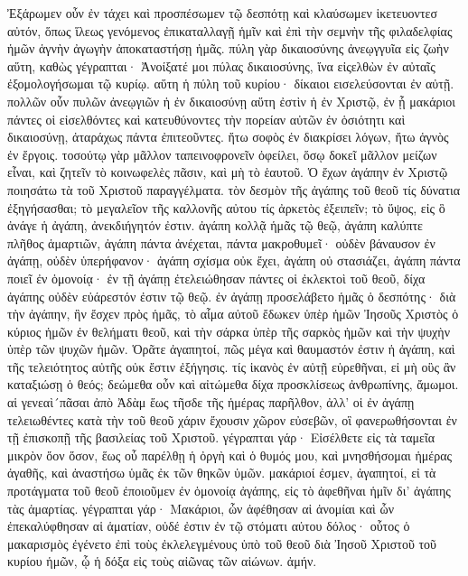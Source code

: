 Ἐξάρωμεν οὖν ἐν τάχει καὶ προσπέσωμεν τῷ δεσπότῃ καὶ κλαύσωμεν ἱκετευοντεσ αὐτόν, ὅπως ἵλεως γενόμενος ἐπικαταλλαγῇ ἡμῖν καὶ ἐπὶ τὴν σεμνὴν τῆς φιλαδελφίας ἡμῶν ἁγνὴν ἀγωγὴν ἀποκαταστήσῃ ἡμᾶς. πύλη γὰρ δικαιοσύνης ἀνεῳγγυῖα εἰς ζωὴν αὕτη, καθὼς γέγραπται· Ἀνοίξατέ μοι πύλας δικαιοσύνης, ἵνα εἰςελθὼν ἐν αὐταῖς ἐξομολογήσωμαι τῷ κυρίῳ. αὕτη ἡ πύλη τοῦ κυρίου· δίκαιοι εισελεύσονται ἐν αὐτῇ. πολλῶν οὖν πυλῶν ἀνεῳγιῶν ἡ ἐν δικαιοσύνῃ αὕτη ἐστὶν ἡ ἐν Χριστῷ, ἐν ᾗ μακάριοι πάντες οἱ εἰσελθόντες καὶ κατευθύνοντες τὴν πορείαν αὐτῶν ἐν ὁσιότητι καὶ δικαιοσύνῃ, ἀταράχως πάντα ἐπιτεοῦντες. ἤτω σοφὸς ἐν διακρίσει λόγων, ἤτω ἁγνὸς ἐν ἔργοις. τοσούτῳ γὰρ μᾶλλον ταπεινοφρονεῖν ὀφείλει, ὅσῳ δοκεῖ μᾶλλον μείζων εἶναι, καὶ ζητεῖν τὸ κοινωφελὲς πᾶσιν, καὶ μὴ τὸ ἑαυτοῦ.
Ὁ ἔχων ἀγάπην ἐν Χριστῷ ποιησάτω τὰ τοῦ Χριστοῦ παραγγέλματα. τὸν δεσμὸν τῆς ἀγάπης τοῦ θεοῦ τίς δύνατια ἐξηγήσασθαι; τὸ μεγαλεῖον τῆς καλλονῆς αὐτου τίς ἀρκετὸς ἐξειπεῖν; τὸ ὕψος, εἰς ὃ ἀνάγε ἡ ἀγάπη, ἀνεκδιήγητόν ἐστιν. ἀγάπη κολλᾷ ἡμᾶς τῷ θεῷ, ἀγάπη καλύπτε πλῆθος ἁμαρτιῶν, ἀγάπη πάντα ἀνέχεται, πάντα μακροθυμεῖ· οὐδὲν βάναυσον ἐν ἀγάπῃ, οὐδὲν ὑπερήφανον· ἀγάπη σχίσμα οὐκ ἔχει, ἀγάπη οὐ στασιάζει, ἀγάπη πάντα ποιεῖ ἐν ὁμονοίᾳ· ἐν τῇ ἀγάπῃ ἐτελειώθησαν πάντες οἱ ἐκλεκτοὶ τοῦ θεοῦ, δίχα ἀγάπης οὐδὲν εὐάρεστόν ἐστιν τῷ θεῷ. ἐν ἀγάπῃ προσελάβετο ἡμᾶς ὁ δεσπότης· διὰ τὴν ἀγάπην, ἣν ἔσχεν πρὸς ἡμᾶς, τὸ αἷμα αὐτοῦ ἔδωκεν ὑπὲρ ἡμῶν Ἰησοῦς Χριστὸς ὁ κύριος ἡμῶν ἐν θελήματι θεοῦ, καὶ τὴν σάρκα ὑπὲρ τῆς σαρκὸς ἡμῶν καὶ τὴν ψυχὴν ὑπὲρ τῶν ψυχῶν ἡμῶν.
Ὁρᾶτε ἀγαπητοί, πῶς μέγα καὶ θαυμαστόν ἐστιν ἡ ἀγάπη, καὶ τῆς τελειότητος αὐτῆς οὐκ ἔστιν ἐξήγησις. τίς ἱκανὸς ἐν αὐτῇ εὑρεθῆναι, εἰ μὴ οὓς ἂν καταξιώσῃ ὁ θεός; δεώμεθα οὖν καὶ αἰτώμεθα δίχα προσκλίσεως ἀνθρωπίνης, ἄμωμοι. αἱ γενεαὶ´πᾶσαι ἀπὸ Ἀδὰμ ἕως τῆσδε τῆς ἡμέρας παρῆλθον, ἀλλ’ οἱ ἐν ἀγάπῃ τελειωθέντες κατὰ τὴν τοῦ θεοῦ χάριν ἔχουσιν χῶρον εὐσεβῶν, οἳ φανερωθήσονται ἐν τῇ ἐπισκοπῇ τῆς βασιλείας τοῦ Χριστοῦ. γέγραπται γάρ· Εἰσέλθετε εἰς τὰ ταμεῖα μικρὸν ὅον ὅσον, ἕως οὗ παρέλθῃ ἡ ὀργὴ καὶ ὁ θυμός μου, καὶ μνησθήσομαι ἡμέρας ἀγαθῆς, καὶ ἀναστήσω ὑμᾶς ἐκ τῶν θηκῶν ὑμῶν. μακάριοί ἐσμεν, ἀγαπητοί, εἰ τὰ προτάγματα τοῦ θεοῦ ἐποιοῦμεν ἐν ὁμονοίᾳ ἀγάπης, εἰς τὸ ἀφεθῆναι ἡμῖν δι’ ἀγάπης τὰς ἁμαρτίας. γέγραπται γάρ· Μακάριοι, ὧν ἀφέθησαν αἱ ἀνομίαι καὶ ὧν ἐπεκαλύφθησαν αἱ ἁματίαν, οὐδέ ἐστιν ἐν τῷ στόματι αὐτου δόλος· οὗτος ὁ μακαρισμὸς ἐγένετο ἐπὶ τοὺς ἐκλελεγμένους ὑπὸ τοῦ θεοῦ διὰ Ἰησοῦ Χριστοῦ τοῦ κυρίου ἡμῶν, ᾧ ἡ δόξα εἰς τοὺς αἰῶνας τῶν αἰώνων. ἀμήν.
